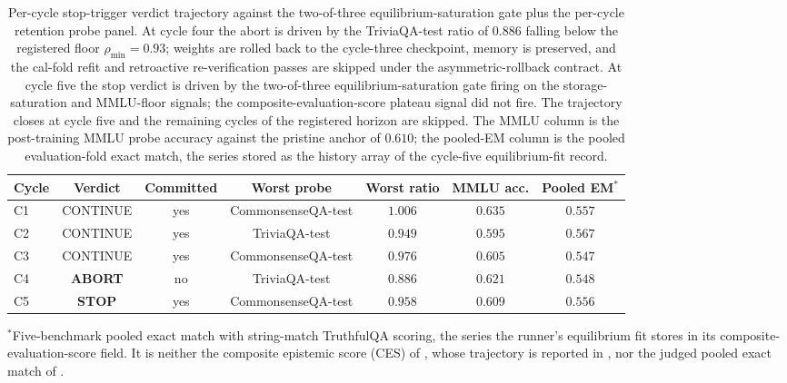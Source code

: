 \begin{table}[!htbp]
\centering\footnotesize
\setlength{\tabcolsep}{4pt}
\renewcommand{\arraystretch}{1.1}
\begin{tabular}{@{}lcccccc@{}}
\toprule
\textbf{Cycle} & \textbf{Verdict} & \textbf{Committed} & \textbf{Worst probe} & \textbf{Worst ratio} & \textbf{MMLU acc.} & \textbf{Pooled EM$^{\ast}$} \\
\midrule
C1 & CONTINUE & yes & CommonsenseQA-test & $1.006$ & $0.635$ & $0.557$ \\
C2 & CONTINUE & yes & TriviaQA-test       & $0.949$ & $0.595$ & $0.567$ \\
C3 & CONTINUE & yes & CommonsenseQA-test & $0.976$ & $0.605$ & $0.547$ \\
C4 & \textbf{ABORT} & no  & TriviaQA-test  & $\mathbf{0.886}$ & $0.621$ & $0.548$ \\
C5 & \textbf{STOP}  & yes & CommonsenseQA-test & $0.958$ & $0.609$ & $0.556$ \\
\bottomrule
\end{tabular}
\caption[Per-cycle stop-trigger verdict trajectory]{Per-cycle stop-trigger verdict trajectory against the two-of-three equilibrium-saturation gate plus the per-cycle retention probe panel. At cycle four the abort is driven by the TriviaQA-test ratio of $0.886$ falling below the registered floor $\rho_{\min} = 0.93$; weights are rolled back to the cycle-three checkpoint, memory is preserved, and the cal-fold refit and retroactive re-verification passes are skipped under the asymmetric-rollback contract. At cycle five the stop verdict is driven by the two-of-three equilibrium-saturation gate firing on the storage-saturation and MMLU-floor signals; the composite-evaluation-score plateau signal did not fire. The trajectory closes at cycle five and the remaining cycles of the registered horizon are skipped. The MMLU column is the post-training MMLU probe accuracy against the pristine anchor of $0.610$; the pooled-EM column is the pooled evaluation-fold exact match, the series stored as the history array of the cycle-five equilibrium-fit record.}
$^{\ast}$Five-benchmark pooled exact match with string-match TruthfulQA scoring, the series the runner's equilibrium fit stores in its composite-evaluation-score field. It is neither the composite epistemic score (CES) of , whose trajectory is reported in , nor the judged pooled exact match of .
\label{tab:app-per-cycle-equilibrium}
\end{table}


